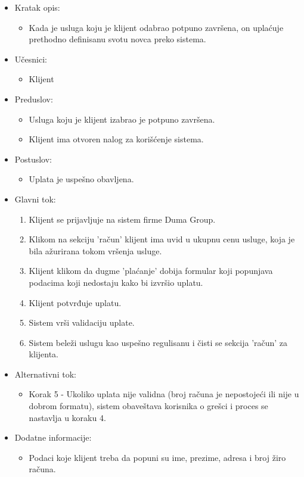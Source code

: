 \documentclass[a4paper]{article}
\begin{document}
\begin{itemize}
    \item Kratak opis: 
    \begin{itemize}
        \item Kada je usluga koju je klijent odabrao potpuno završena, on uplaćuje prethodno definisanu svotu novca preko sistema.
    \end{itemize}
    \item Učesnici:
        \begin{itemize}
        \item Klijent
    \end{itemize}
    \item Preduslov:
        \begin{itemize}
            \item Usluga koju je klijent izabrao je potpuno završena.
            \item Klijent ima otvoren nalog za korišćenje sistema.
        \end{itemize}
    \item Postuslov:
        \begin{itemize}
            \item Uplata je uspešno obavljena.
            \end{itemize}
    \item Glavni tok:
        \begin{enumerate}
            \item Klijent se prijavljuje na sistem firme Duma Group.
            \item Klikom na sekciju 'račun' klijent ima uvid u ukupnu cenu usluge, koja je bila ažurirana tokom vršenja usluge.
            \item Klijent klikom da dugme 'plaćanje' dobija formular koji popunjava podacima koji nedostaju kako bi izvršio uplatu.
            \item Klijent potvrđuje uplatu.
            \item Sistem vrši validaciju uplate.
            \item Sistem beleži uslugu kao uspešno regulisanu i čisti se sekcija 'račun' za klijenta.
        \end{enumerate}
    \item Alternativni tok:
        \begin{itemize}
            \item Korak 5 - Ukoliko uplata nije validna (broj računa je nepostojeći ili nije u dobrom formatu), sistem obaveštava korisnika o grešci i proces se nastavlja u koraku 4.  
    \end{itemize}
    \item Dodatne informacije:
        \begin{itemize}
            \item Podaci koje klijent treba da popuni su ime, prezime, adresa i broj žiro računa.
        \end{itemize}
\end{itemize}
\end{document}
